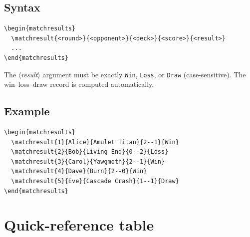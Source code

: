 \documentclass[a4paper,11pt]{article}
\newcommand{\meta}[1]{\textnormal{\textit{$\langle$#1$\rangle$}}}
\begin{document}
\subsection{Syntax}

\begin{lstlisting}
\begin{matchresults}
  \matchresult{<round>}{<opponent>}{<deck>}{<score>}{<result>}
  ...
\end{matchresults}
\end{lstlisting}

The \meta{result} argument must be exactly \texttt{Win},
\texttt{Loss}, or \texttt{Draw} (case-sensitive).  The
win--loss--draw record is computed automatically.

\subsection{Example}

\begin{lstlisting}
\begin{matchresults}
  \matchresult{1}{Alice}{Amulet Titan}{2--1}{Win}
  \matchresult{2}{Bob}{Living End}{0--2}{Loss}
  \matchresult{3}{Carol}{Yawgmoth}{2--1}{Win}
  \matchresult{4}{Dave}{Burn}{2--0}{Win}
  \matchresult{5}{Eve}{Cascade Crash}{1--1}{Draw}
\end{matchresults}
\end{lstlisting}
\begin{result}
\begin{matchresults}
\end{matchresults}
\end{result}

\section{Quick-reference table}
\end{document}
